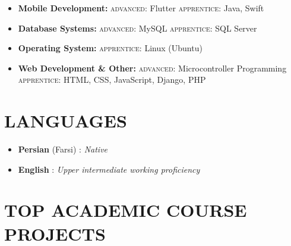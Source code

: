 \documentclass[margin]{res}
\begin{document}
\begin{resume}
\begin{itemize}
\item \textbf{Mobile Development:}
\subitem \textsc{advanced:}
Flutter
\subitem \textsc{apprentice:}
Java, Swift\\

\item \textbf{Database Systems:}
\subitem \textsc{advanced:}
MySQL
\subitem \textsc{apprentice:}
SQL Server\\

\item \textbf{Operating System:}
\subitem \textsc{apprentice:}
Linux (Ubuntu)\\

\item \textbf{Web Development \& Other:}
\subitem \textsc{advanced:}
Microcontroller Programming
\subitem \textsc{apprentice:}
HTML, CSS, JavaScript, Django, PHP\\
	
\end{itemize}



\section{LANGUAGES}

\begin{itemize} \itemsep +3pt

\item \textbf{Persian} (Farsi) : \textit{Native}
\item \textbf{English} : \textit{Upper intermediate working proficiency}

\end{itemize} 



\section{TOP ACADEMIC COURSE PROJECTS}


\end{resume}
\end{document}
